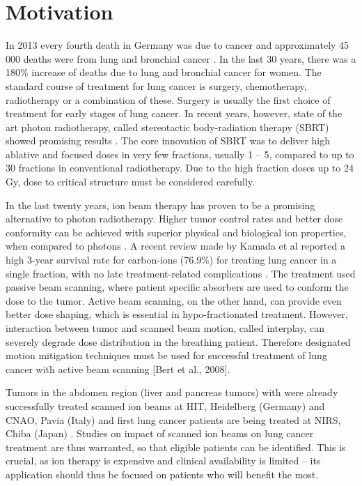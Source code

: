 \section*{Motivation}
In 2013 every fourth death in Germany was due to cancer and approximately 45 000 deaths were from lung and bronchial cancer  \cite{Destatis2015}. 
In the last 30 years, there was a 180\% increase of deaths due to lung and bronchial cancer for women. 
The standard course of treatment for lung cancer is surgery, chemotherapy, radiotherapy or a combination of these. 
Surgery is usually the first choice of treatment for early stages of lung cancer. In recent years, however, state of the art photon radiotherapy, 
called stereotactic body-radiation therapy (SBRT) showed promising results \cite{Baumann2009, Greco2011}. 
The core innovation of SBRT was to deliver high ablative and focused doses in very few fractions, usually 1 – 5, compared to 
up to 30 fractions in conventional radiotherapy. Due to the high fraction doses up to 24 Gy, dose to critical structure must be considered carefully.

In the last twenty years, ion beam therapy has proven to be a promising alternative to photon radiotherapy. 
Higher tumor control rates and better dose conformity can be achieved with superior physical and biological ion properties,
when compared to photons \cite{Tsujii2008,Durante2010}. A recent review made by Kamada et al reported a high 3-year survival rate for carbon-ions (76.9\%) 
for treating lung cancer in a single fraction, with no late treatment-related complications \cite{Kamada2016}. 
The treatment used passive beam scanning, where patient specific absorbers are used to conform the dose to the tumor. 
Active beam scanning, on the other hand, can provide even better dose shaping, which is essential in hypo-fractionated treatment. 
However, interaction between tumor and scanned beam motion, called interplay, can severely degrade dose distribution in the breathing patient. 
Therefore designated motion mitigation techniques must be used for successful treatment of lung cancer with active beam scanning [Bert et al., 2008].

Tumors in the abdomen region (liver and pancreas tumors) with were already successfully treated scanned ion beams  at HIT, Heidelberg (Germany) and CNAO, Pavia (Italy) \cite{Habermehl2013, Rossi2016}
and first lung cancer patients are being treated at NIRS, Chiba (Japan) \cite{Mori2016}. Studies on 
impact of scanned ion beams on lung cancer treatment are thus warranted, so that eligible patients can be identified. 
This is crucial, as ion therapy is expensive and clinical availability is limited – its application should thus be focused on patients who will benefit the most.

